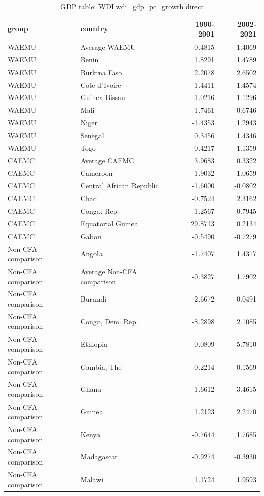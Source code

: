 \begin{table}

\caption{GDP table: WDI wdi_gdp_pc_growth direct}
\centering
\begin{tabular}[t]{llrr}
\toprule
group & country & 1990-2001 & 2002-2021\\
\midrule
WAEMU & Average WAEMU & 0.4815 & 1.4069\\
WAEMU & Benin & 1.8291 & 1.4789\\
WAEMU & Burkina Faso & 2.2078 & 2.6502\\
WAEMU & Cote d'Ivoire & -1.4411 & 1.4574\\
WAEMU & Guinea-Bissau & 1.0216 & 1.1296\\
\addlinespace
WAEMU & Mali & 1.7461 & 0.6746\\
WAEMU & Niger & -1.4353 & 1.2943\\
WAEMU & Senegal & 0.3456 & 1.4346\\
WAEMU & Togo & -0.4217 & 1.1359\\
CAEMC & Average CAEMC & 3.9683 & 0.3322\\
\addlinespace
CAEMC & Cameroon & -1.9032 & 1.0659\\
CAEMC & Central African Republic & -1.6000 & -0.0802\\
CAEMC & Chad & -0.7524 & 2.3162\\
CAEMC & Congo, Rep. & -1.2567 & -0.7945\\
CAEMC & Equatorial Guinea & 29.8713 & 0.2134\\
\addlinespace
CAEMC & Gabon & -0.5490 & -0.7279\\
Non-CFA comparison & Angola & -1.7407 & 1.4317\\
Non-CFA comparison & Average Non-CFA comparison & -0.3827 & 1.7902\\
Non-CFA comparison & Burundi & -2.6672 & 0.0491\\
Non-CFA comparison & Congo, Dem. Rep. & -8.2898 & 2.1085\\
\addlinespace
Non-CFA comparison & Ethiopia & -0.0809 & 5.7810\\
Non-CFA comparison & Gambia, The & 0.2214 & 0.1569\\
Non-CFA comparison & Ghana & 1.6612 & 3.4615\\
Non-CFA comparison & Guinea & 1.2123 & 2.2470\\
Non-CFA comparison & Kenya & -0.7644 & 1.7685\\
\addlinespace
Non-CFA comparison & Madagascar & -0.9274 & -0.3930\\
Non-CFA comparison & Malawi & 1.1724 & 1.9593\\

\end{tabular}
\end{table}
